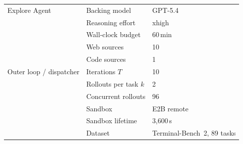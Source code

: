 \begin{table}[h]
\begin{tabular}{lll}
        \midrule
        Explore Agent
            & Backing model              & GPT-5.4 \\
            & Reasoning effort           & xhigh \\
            & Wall-clock budget          & 60\,min \\
            & Web sources                & 10 \\
            & Code sources               & 1 \\
        \midrule
        Outer loop / dispatcher
            & Iterations $T$             & 10 \\
            & Rollouts per task $k$      & 2 \\
            & Concurrent rollouts        & 96 \\
            & Sandbox                    & E2B remote \\
            & Sandbox lifetime           & 3{,}600\,s \\
            & Dataset                    & Terminal-Bench~2, 89 tasks \\
        \bottomrule
    \end{tabular}
\end{table}
